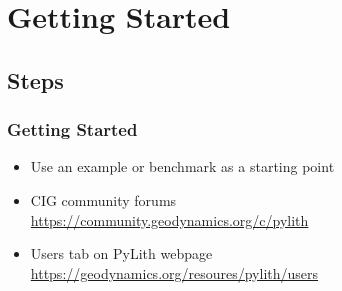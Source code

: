 \documentclass[aspectratio=169]{beamer}
\begin{document}
\section{Getting Started}
\subsection{Steps}

\begin{frame}
  \frametitle{Getting Started}
  \summary{}

  \begin{itemize}
   \url{https://pylith.readthedocs.io}
  \item Use an example or benchmark as a starting point
  \item CIG community forums\\
    \url{https://community.geodynamics.org/c/pylith}
  \item Users tab on PyLith webpage\\
    \url{https://geodynamics.org/resoures/pylith/users}
  \end{itemize}

\end{frame}
\end{document}
